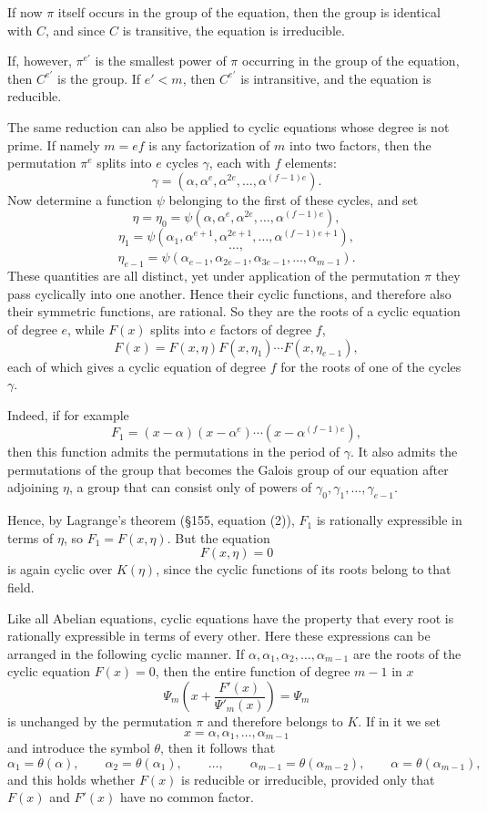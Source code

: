 \documentclass[11pt,a4paper]{book}
\begin{document}
If now $\pi$ itself occurs in the group of the equation, then the group is identical with $C$, and since $C$ is transitive, the equation is irreducible.

If, however, $\pi^{e'}$ is the smallest power of $\pi$ occurring in the group of the equation, then $C^{e'}$ is the group. If $e'<m$, then $C^{e'}$ is intransitive, and the equation is reducible.

The same reduction can also be applied to cyclic equations whose degree is not prime. If namely $m=ef$ is any factorization of $m$ into two factors, then the permutation $\pi^e$ splits into $e$ cycles $\gamma$, each with $f$ elements:
\[
\gamma=(\alpha,\alpha^e,\alpha^{2e},\dots,\alpha^{(f-1)e}).
\tag{9}
\]
Now determine a function $\psi$ belonging to the first of these cycles, and set
\[
\eta=\eta_0=\psi(\alpha,\alpha^e,\alpha^{2e},\dots,\alpha^{(f-1)e}),
\]
\[
\eta_1=\psi(\alpha_1,\alpha^{e+1},\alpha^{2e+1},\dots,\alpha^{(f-1)e+1}),
\]
\[
\dots,
\]
\[
\eta_{e-1}=\psi(\alpha_{e-1},\alpha_{2e-1},\alpha_{3e-1},\dots,\alpha_{m-1}).
\tag{10}
\]
These quantities are all distinct, yet under application of the permutation $\pi$ they pass cyclically into one another. Hence their cyclic functions, and therefore also their symmetric functions, are rational. So they are the roots of a cyclic equation of degree $e$, while $F(x)$ splits into $e$ factors of degree $f$,
\[
F(x)=F(x,\eta)F(x,\eta_1)\cdots F(x,\eta_{e-1}),
\]
each of which gives a cyclic equation of degree $f$ for the roots of one of the cycles $\gamma$.

Indeed, if for example
\[
F_1=(x-\alpha)(x-\alpha^e)\cdots(x-\alpha^{(f-1)e}),
\]
then this function admits the permutations in the period of $\gamma$. It also admits the permutations of the group that becomes the Galois group of our equation after adjoining $\eta$, a group that can consist only of powers of $\gamma_0,\gamma_1,\dots,\gamma_{e-1}$.

Hence, by Lagrange's theorem (\S 155, equation (2)), $F_1$ is rationally expressible in terms of $\eta$, so $F_1=F(x,\eta)$. But the equation
\[
F(x,\eta)=0
\]
is again cyclic over $K(\eta)$, since the cyclic functions of its roots belong to that field.

Like all Abelian equations, cyclic equations have the property that every root is rationally expressible in terms of every other. Here these expressions can be arranged in the following cyclic manner. If $\alpha,\alpha_1,\alpha_2,\dots,\alpha_{m-1}$ are the roots of the cyclic equation $F(x)=0$, then the entire function of degree $m-1$ in $x$
\[
\Psi_m\!\left(x+\frac{F'(x)}{\Psi'_m(x)}\right)=\Psi_m
\]
is unchanged by the permutation $\pi$ and therefore belongs to $K$. If in it we set
\[
x=\alpha,\alpha_1,\dots,\alpha_{m-1}
\]
and introduce the symbol $\theta$, then it follows that
\[
\alpha_1=\theta(\alpha),\qquad
\alpha_2=\theta(\alpha_1),\qquad
\dots,\qquad
\alpha_{m-1}=\theta(\alpha_{m-2}),\qquad
\alpha=\theta(\alpha_{m-1}),
\tag{11}
\]
and this holds whether $F(x)$ is reducible or irreducible, provided only that $F(x)$ and $F'(x)$ have no common factor.
\end{document}
